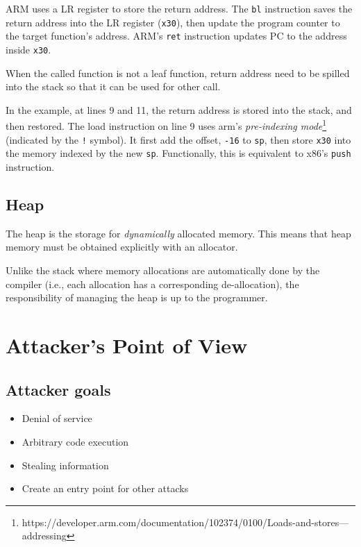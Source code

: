 \documentclass[11pt]{memoir}
\begin{document}
ARM uses a LR register to store the return address. 
The \texttt{bl} instruction saves the return address into the LR register (\texttt{x30}), then update the program counter to the target function's address.
ARM's \texttt{ret} instruction updates PC to the address inside \texttt{x30}.

When the called function is not a leaf function, return address need to be spilled into the stack so that it can be used for other call.

In the example, at lines 9 and 11, the return address is stored into the stack, and then restored.
The load instruction on line 9 uses arm's \emph{pre-indexing mode}\footnote{https://developer.arm.com/documentation/102374/0100/Loads-and-stores---addressing} (indicated by the \texttt{!} symbol).
It first add the offset, \texttt{-16} to \texttt{sp}, then store \texttt{x30} into the memory indexed by the new \texttt{sp}.
Functionally, this is equivalent to x86's \texttt{push} instruction.


 
\section{Heap}
The heap is the storage for \emph{dynamically} allocated memory.
This means that heap memory must be obtained explicitly with an allocator.

Unlike the stack where memory allocations are automatically done by the compiler (i.e., each allocation has a corresponding de-allocation), the responsibility of managing the heap is up to the programmer.





\chapter{Attacker's Point of View}
\section{Attacker goals}
\begin{itemize}
    \item Denial of service
    \item Arbitrary code execution
    \item Stealing information
    \item Create an entry point for other attacks
\end{itemize}
\end{document}
